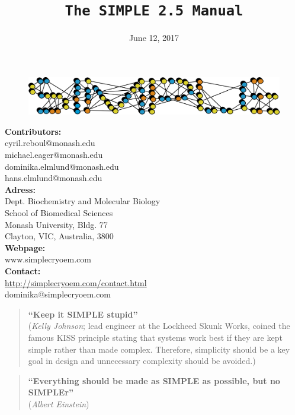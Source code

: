 \documentclass[a4paper,11pt]{article}
\newcommand{\prgname}[1]{\textcolor{NavyBlue}{\texttt{#1}}}
\begin{document}
\begin{figure}
\centering
\includegraphics[keepaspectratio=true,scale=0.6]{../SIMPLE_logo/rawlogo}
\end{figure}

\title{\prgname{The SIMPLE 2.5 Manual}}
\date{June 12, 2017}
\maketitle

\vspace{1em}
\begin{minipage}[ht]{0.48\textwidth}
\textbf{Contributors:}\\
cyril.reboul@monash.edu\\
michael.eager@monash.edu\\
dominika.elmlund@monash.edu\\
hans.elmlund@monash.edu\\
\textbf{Adress:}\\
Dept. Biochemistry and Molecular Biology\\
School of Biomedical Sciences\\
Monash University, Bldg. 77\\
Clayton, VIC, Australia, 3800\\
\textbf{Webpage:}\\
www.simplecryoem.com\\
\textbf{Contact:}\\
\url{http://simplecryoem.com/contact.html}\\
dominika@simplecryoem.com\\
\end{minipage}
\vspace{20pt}

\begin{quote}
\textbf{``Keep it SIMPLE stupid''}\\(\textit{Kelly Johnson}; lead engineer at the Lockheed Skunk Works, coined the famous KISS principle stating that systems work best if they are kept simple rather than made complex. Therefore, simplicity should be a key goal in design and unnecessary complexity should be avoided.)
\end{quote}

\begin{quote}
\textbf{``Everything should be made as SIMPLE as possible, but no SIMPLEr''}\\(\textit{Albert Einstein})
\end{quote}
\end{document}
